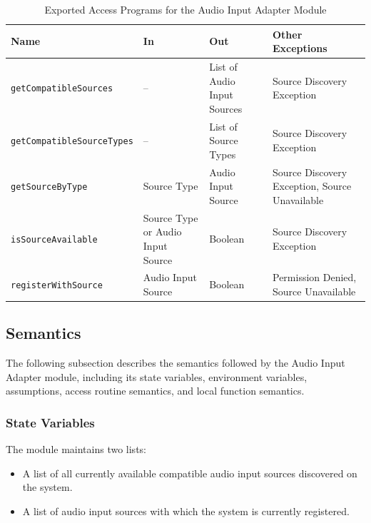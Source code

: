 \documentclass[12pt, titlepage]{article}
\begin{document}
\begin{table}[H]
\centering
\caption{Exported Access Programs for the Audio Input Adapter Module}
\label{tab:audio-adapter}

\noindent
\small
\begin{tabularx}{\textwidth}{
    @{}
    >{\raggedright\arraybackslash}p{}
    >{\raggedright\arraybackslash}p{}
    >{\raggedright\arraybackslash}p{}
    >{\raggedright\arraybackslash}X
    @{}
}
\toprule
\textbf{Name} & \textbf{In} & \textbf{Out} & \textbf{Other Exceptions}\\
\midrule
\texttt{getCompatibleSources}
& --
& List of Audio Input Sources
& Source Discovery Exception\\

\texttt{getCompatibleSourceTypes}
& --
& List of Source Types
& Source Discovery Exception\\

\texttt{getSourceByType}
& Source Type
& Audio Input Source
& Source Discovery Exception, Source Unavailable\\

\texttt{isSourceAvailable}
& Source Type or Audio Input Source
& Boolean
& Source Discovery Exception\\

\texttt{registerWithSource}
& Audio Input Source
& Boolean
& Permission Denied, Source Unavailable\\
\bottomrule
\end{tabularx}
\normalsize
\end{table}



\subsection{Semantics}

The following subsection describes the semantics followed by the Audio Input Adapter module, including its state variables, environment variables, assumptions, access routine semantics, and local function semantics.

\subsubsection{State Variables}

The module maintains two lists:

\begin{itemize}
    \item A list of all currently available compatible audio input sources discovered on the system.
    \item A list of audio input sources with which the system is currently registered.
\end{itemize}
\end{document}
